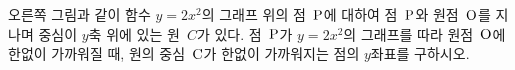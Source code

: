 \noindent\begin{minipage}[t]{0.58\linewidth}\vspace{0pt}\raggedright 오른쪽 그림과 같이 함수 $y=2x^2$의 그래프 위의 점~$\mathrm{P}$에 대하여 점~$\mathrm{P}$와 원점~$\mathrm{O}$를 지나며 중심이 $y$축 위에 있는 원~$C$가 있다. 점~$\mathrm{P}$가 $y=2x^2$의 그래프를 따라 원점~$\mathrm{O}$에 한없이 가까워질 때, 원의 중심~$\mathrm{C}$가 한없이 가까워지는 점의 $y$좌표를 구하시오.\end{minipage}\hfill\begin{minipage}[t]{0.4\linewidth}\vspace{0pt}\centering \resizebox{\ifdim\width>\linewidth\linewidth\else\width\fi}{!}{}\end{minipage}\par
